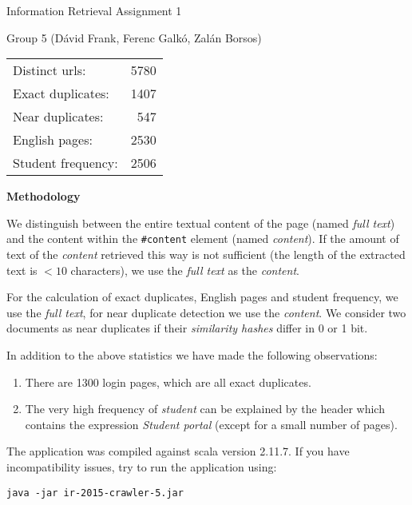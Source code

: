 \documentclass[12pt]{article}
\begin{document}
\begin{center}

Information Retrieval Assignment 1


Group 5 (Dávid Frank, Ferenc Galkó, Zalán Borsos)

\vspace{1cm}

\begin{tabular}{l r}
Distinct urls: & 5780\\
Exact duplicates: & 1407\\
Near duplicates: & 547\\
English pages: & 2530\\
Student frequency: & 2506\\
\end{tabular}
\end{center}

\vspace{1cm}

\textbf{Methodology}

We distinguish between the entire textual content of the page (named \textit{full text}) and the content within the \texttt{\#content} element (named \textit{content}). If the amount of text of the \textit{content} retrieved this way is not sufficient (the length of the extracted text is $<10$ characters), we use the \textit{full text} as the \textit{content}.

For the calculation of exact duplicates, English pages and student frequency, we use the \textit{full text}, for near duplicate detection we use the \textit{content}. We consider two documents as near duplicates if their \textit{similarity hashes} differ in 0 or 1 bit.


In addition to the above statistics we have made the following observations:
\begin{enumerate}
\item
There are 1300 login pages, which are all exact duplicates.
\item
The very high frequency of \textit{student} can be explained by the header which contains the expression \textit{Student portal} (except for a small number of pages).
\end{enumerate}



The application was compiled against scala version 2.11.7. If you have incompatibility issues, try to run the application using:

\texttt{java -jar ir-2015-crawler-5.jar}
\end{document}
